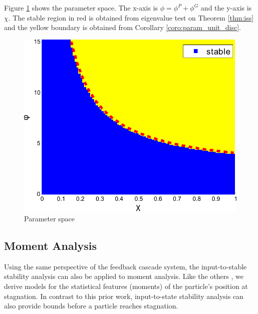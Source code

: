 Figure \ref{fig:paramSpace} shows the parameter space.
The x-axis is $ \phi = \phi^{P} + \phi^{G} $ and the y-axis is $ \chi $.
The stable region in red is obtained from eigenvalue test on Theorem \ref{thm:iss} and the yellow boundary is obtained from Corollary \ref{coro:param_unit_disc}.
\begin{figure}
\centering
\includegraphics[width=0.5\linewidth]{./fig/param2}
\caption{Parameter space}
\label{fig:paramSpace}
\end{figure}

\subsection{Moment Analysis}
\label{sec:moment_analysis}

Using the same perspective of the feedback cascade system, the input-to-stable stability analysis can also be applied to moment analysis.
Like the others \cite{Jiang20078,Poli:2008:DSS:1384929.1384944}, we derive models for the statistical features (moments) of the particle's position at stagnation.
In contrast to this prior work,
input-to-state stability analysis can also provide bounds before a particle reaches stagnation.


